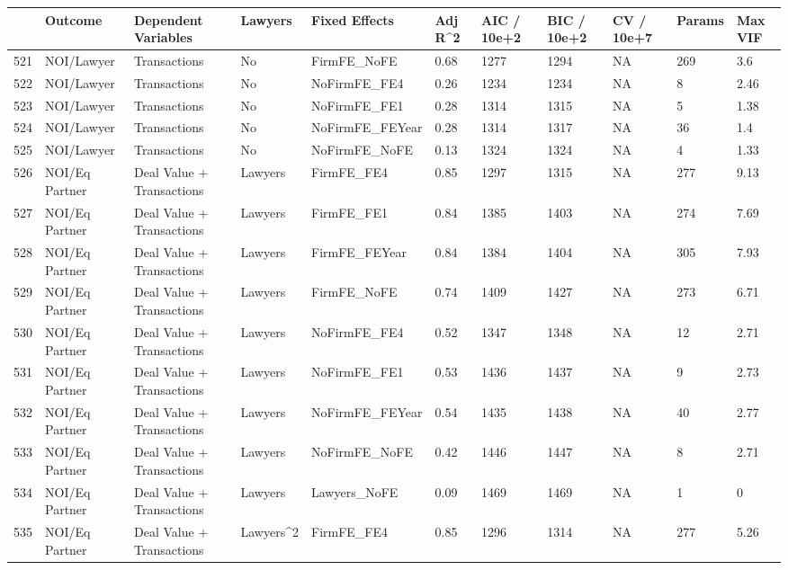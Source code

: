 \begin{table}[ht]
\centering
\begin{tabular}{rllllllllll}
  \hline
 & Outcome & Dependent Variables & Lawyers & Fixed Effects & Adj R^2 & AIC / 10e+2 & BIC / 10e+2 & CV / 10e+7 & Params & Max VIF \\ 
  \hline
521 & NOI/Lawyer & Transactions & No & FirmFE\_NoFE & 0.68 & 1277 & 1294 & NA & 269 & 3.6 \\ 
  522 & NOI/Lawyer & Transactions & No & NoFirmFE\_FE4 & 0.26 & 1234 & 1234 & NA & 8 & 2.46 \\ 
  523 & NOI/Lawyer & Transactions & No & NoFirmFE\_FE1 & 0.28 & 1314 & 1315 & NA & 5 & 1.38 \\ 
  524 & NOI/Lawyer & Transactions & No & NoFirmFE\_FEYear & 0.28 & 1314 & 1317 & NA & 36 & 1.4 \\ 
  525 & NOI/Lawyer & Transactions & No & NoFirmFE\_NoFE & 0.13 & 1324 & 1324 & NA & 4 & 1.33 \\ 
  526 & NOI/Eq Partner & Deal Value + Transactions & Lawyers & FirmFE\_FE4 & 0.85 & 1297 & 1315 & NA & 277 & 9.13 \\ 
  527 & NOI/Eq Partner & Deal Value + Transactions & Lawyers & FirmFE\_FE1 & 0.84 & 1385 & 1403 & NA & 274 & 7.69 \\ 
  528 & NOI/Eq Partner & Deal Value + Transactions & Lawyers & FirmFE\_FEYear & 0.84 & 1384 & 1404 & NA & 305 & 7.93 \\ 
  529 & NOI/Eq Partner & Deal Value + Transactions & Lawyers & FirmFE\_NoFE & 0.74 & 1409 & 1427 & NA & 273 & 6.71 \\ 
  530 & NOI/Eq Partner & Deal Value + Transactions & Lawyers & NoFirmFE\_FE4 & 0.52 & 1347 & 1348 & NA & 12 & 2.71 \\ 
  531 & NOI/Eq Partner & Deal Value + Transactions & Lawyers & NoFirmFE\_FE1 & 0.53 & 1436 & 1437 & NA & 9 & 2.73 \\ 
  532 & NOI/Eq Partner & Deal Value + Transactions & Lawyers & NoFirmFE\_FEYear & 0.54 & 1435 & 1438 & NA & 40 & 2.77 \\ 
  533 & NOI/Eq Partner & Deal Value + Transactions & Lawyers & NoFirmFE\_NoFE & 0.42 & 1446 & 1447 & NA & 8 & 2.71 \\ 
  534 & NOI/Eq Partner & Deal Value + Transactions & Lawyers & Lawyers\_NoFE & 0.09 & 1469 & 1469 & NA & 1 & 0 \\ 
  535 & NOI/Eq Partner & Deal Value + Transactions & Lawyers^2 & FirmFE\_FE4 & 0.85 & 1296 & 1314 & NA & 277 & 5.26 \\ 

\end{tabular}
\end{table}
